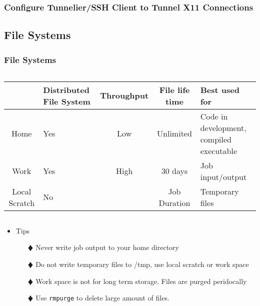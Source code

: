 \documentclass[slidestop,mathserif,compress,xcolor=svgnames,table]{beamer}
\begin{document}
\begin{frame}
  \frametitle{\small Configure Tunnelier/SSH Client to Tunnel X11 Connections}
  \begin{center}
  \end{center}
\end{frame}

\subsection{File Systems}
\begin{frame}
  \frametitle{\small File Systems}
  \scriptsize{
  \begin{columns}
    \column{11cm}
    \begin{block}{}
      \begin{center}
	\begin{tabular}{|c|p{1.5cm}|c|c|p{2.5cm}|}
	  \hline
	  & Distributed File System & Throughput & File life time & Best used for \\
	  \hline
	  {Home} & Yes & Low & Unlimited & {Code in development, compiled executable}\\ 
	  \hline
	  Work & Yes & High & 30 days & Job input/output \\
	  \hline
	  {Local Scratch} & No & & Job Duration & Temporary files \\
	  \hline
	\end{tabular}
      \end{center}
    \end{block}
  \end{columns}
  }
  \begin{itemize}
    \item {\footnotesize Tips}
    \begin{enumerate}
      \item[$\vardiamond$] Never write job output to your home directory
      \item[$\vardiamond$] Do not write temporary files to /tmp, use local scratch or work space
      \item[$\vardiamond$] Work space is not for long term storage. Files are purged peridocally
      \item[$\vardiamond$] Use \texttt{rmpurge} to delete large amount of files.
    \end{enumerate}
  \end{itemize}
\end{frame}
\end{document}
